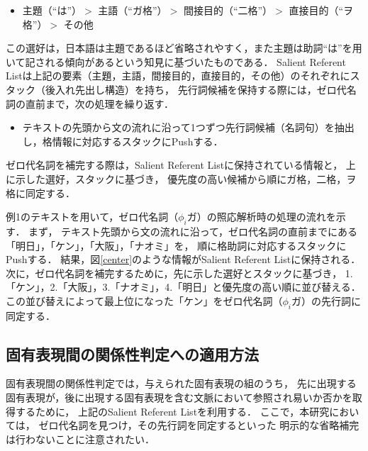 \documentclass[japanese]{jnlp_1.4}
\begin{document}
\vspace{1\baselineskip}
\begin{itemize}
\item 主題（``は''）{$>$} 主語（``ガ格''）{$>$} 間接目的（``二格''）{$>$} 直接目的（``ヲ格''）{$>$} その他
\end{itemize}
\vspace{1\baselineskip}

この選好は，日本語は主題であるほど省略されやすく，また主題は助詞``は''を用いて記される傾向があるという知見に基づいたものである．
Salient Referent Listは上記の要素（主題，主語，間接目的，直接目的，その他）のそれぞれにスタック（後入れ先出し構造）を持ち，
先行詞候補を保持する際には，ゼロ代名詞の直前まで，次の処理を繰り返す．

\vspace{1\baselineskip}
\begin{itemize}
\item テキストの先頭から文の流れに沿って1つずつ先行詞候補（名詞句）を抽出し，格情報に対応するスタックにPushする．
\end{itemize}
\vspace{1\baselineskip}

ゼロ代名詞を補完する際は，Salient Referent Listに保持されている情報と，
上に示した選好，スタックに基づき，
優先度の高い候補から順にガ格，二格，ヲ格に同定する．

例1のテキストを用いて，ゼロ代名詞（{$\phi_{i}$}ガ）の照応解析時の処理の流れを示す．
まず，
テキスト先頭から文の流れに沿って，ゼロ代名詞の直前までにある「明日」，「ケン」，「大阪」，「ナオミ」を，
順に格助詞に対応するスタックにPushする．
結果，図{\ref{center}}のような情報がSalient Referent Listに保持される．
次に，ゼロ代名詞を補完するために，先に示した選好とスタックに基づき，
1.「ケン」，2.「大阪」，3.「ナオミ」，4.「明日」と優先度の高い順に並び替える．
この並び替えによって最上位になった「ケン」をゼロ代名詞（{$\phi_{i}$}ガ）の先行詞に同定する．



\subsection{固有表現間の関係性判定への適用方法}

固有表現間の関係性判定では，与えられた固有表現の組のうち，
先に出現する固有表現が，後に出現する固有表現を含む文脈において参照され易いか否かを取得するために，
上記のSalient Referent Listを利用する．
ここで，本研究においては，
ゼロ代名詞を見つけ，その先行詞を同定するといった
明示的な省略補完は行わないことに注意されたい．
\end{document}

